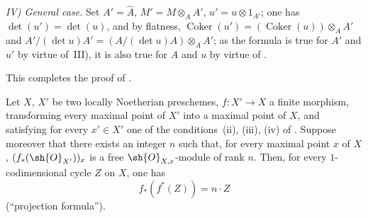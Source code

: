 
\emph{IV) General case.}
Set $A'=\hat{A}$, $M'=M\otimes_A A'$, $u'=u\otimes 1_{A'}$;
one has $\det(u')=\det(u)$, and by flatness, $\operatorname{Coker}(u')=(\operatorname{Coker}(u))\otimes_A A'$ and $A'/(\det u)A'=(A/(\det u)A)\otimes_A A'$;
as the formula  is true for $A'$ and $u'$ by virtue of~III), it is also true for $A$ and $u$ by virtue of .

This completes the proof of .

\begin{proposition}[21.10.18]
\label{IV.21.10.18}
Let $X$, $X'$ be two locally Noetherian preschemes, $f:X'\to X$ a finite morphism, transforming every maximal point of $X'$ into a maximal point of $X$, and satisfying for every $x'\in X'$ one of the conditions~(ii), (iii), (iv) of .
Suppose moreover that there exists an integer $n$ such that, for every maximal point $x$ of $X$, $(f_*(\sh{O}_{X'}))_x$ is a free $\sh{O}_{X,x}$-module of rank $n$.
Then, for every $1$-codimensional cycle $Z$ on $X$, one has
\[
\label{IV.21.10.18.1}
  f_*(f^*(Z))=n\cdot Z
  \tag{21.10.18.1}
\]
(``projection formula'').
\end{proposition}

